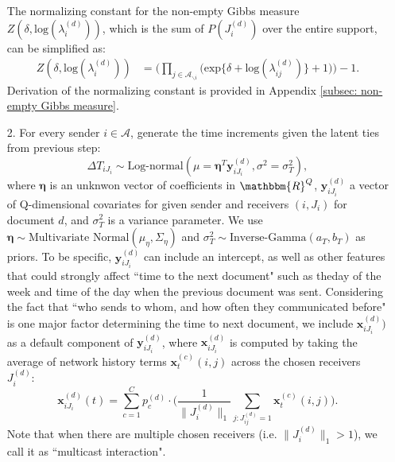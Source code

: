 \begin{itemize}
	The normalizing constant for the non-empty Gibbs measure $Z(\delta,\mbox{log}(\lambda_i^{(d)}))$, which is the sum of $P(J_i^{(d)})$ over the entire support, can be simplified as: 
	\begin{equation}
	\begin{aligned}
	Z(\delta,\mbox{log}(\lambda_i^{(d)})) &=\Big(\prod_{j \in \mathcal{A}_{\backslash i}} \Big(\mbox{exp}\{\delta+\mbox{log}(\lambda_{ij}^{(d)})\} + 1\Big)\Big)-1.
		\end{aligned}
				\label{alg:normalizingconstant}
	\end{equation}
	Derivation of the normalizing constant is provided in Appendix \ref{subsec: non-empty Gibbs measure}.
	\item[2.] For every sender $i \in \mathcal{A}$, generate the time increments given the latent ties from previous step: \begin{equation}
\Delta T_{i{J_i}} \sim \mbox{Log-normal}(\mu = \boldsymbol{\eta}^T\boldsymbol{y}_{i{J_i}}^{(d)}, \sigma^2 = \sigma_T^2),
		\label{alg:timeincrement}
	\end{equation}
	where $\boldsymbol{\eta}$ is an unknwon vector of coefficients in $\mathbbm{R}^{Q}$, $\boldsymbol{y}_{i{J_i}}^{(d)}$ a vector of Q-dimensional covariates for given sender and receivers $(i, J_i)$ for document $d$, and $\sigma_T^2$ is a variance parameter. We use $\boldsymbol{\eta} \sim \mbox{Multivariate Normal}(\mu_\eta, \Sigma_\eta)$ and $\sigma_T^2 \sim \mbox{Inverse-Gamma}(a_T, b_T)$ as priors. To be specific, $\boldsymbol{y}_{i{J_i}}^{(d)}$ can include an intercept, as well as other features that could strongly affect ``time to the next document" such as theday of the week and time of the day when the previous document was sent. Considering the fact that ``who sends to whom, and how often they communicated before" is one major factor determining the time to next document, we include $\boldsymbol{x}_{i{J_i}}^{(d)})$ as a default component of $\boldsymbol{y}_{i{J_i}}^{(d)}$, where $\boldsymbol{x}_{i{J_i}}^{(d)}$ is computed by taking the average of network history terms $\boldsymbol{x}^{(c)}_t(i, j)$ across the chosen receivers $J_i^{(d)}$:
	\begin{equation}
\boldsymbol{x}^{(d)}_{iJ_i}(t)= \sum\limits_{c=1}^{C} p^{(d)}_c\cdot\Big(\frac{1}{\lVert J_i^{(d)} \rVert_1}\sum\limits_{j: J^{(d)}_{ij}=1} \boldsymbol{x}^{(c)}_t(i, j)\Big).
			\label{alg:multicastlambda}
	\end{equation}
	Note that when there are multiple chosen receivers (i.e. $\lVert J_i^{(d)}\rVert_1 > 1$), we call it as ``multicast interaction".

\end{itemize}
